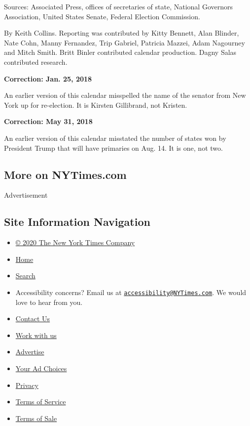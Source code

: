 Sources: Associated Press, offices of secretaries of state, National
Governors Association, United States Senate, Federal Election
Commission.

By Keith Collins. Reporting was contributed by Kitty Bennett, Alan
Blinder, Nate Cohn, Manny Fernandez, Trip Gabriel, Patricia Mazzei, Adam
Nagourney and Mitch Smith. Britt Binler contributed calendar production.
Dagny Salas contributed research.

\textbf{Correction: Jan. 25, 2018}

An earlier version of this calendar misspelled the name of the senator
from New York up for re-election. It is Kirsten Gillibrand, not Kristen.

\textbf{Correction: May 31, 2018}

An earlier version of this calendar misstated the number of states won
by President Trump that will have primaries on Aug. 14. It is one, not
two.

\hypertarget{more-on-nytimescom}{%
\subsection{More on NYTimes.com}\label{more-on-nytimescom}}

Advertisement

\hypertarget{site-information-navigation}{%
\subsection{Site Information
Navigation}\label{site-information-navigation}}

\begin{itemize}
\tightlist
\item
  \href{https://help.nytimes3xbfgragh.onion/hc/en-us/articles/115014792127-Copyright-notice}{©
  2020 The New York Times Company}
\item
  \href{https://www.nytimes3xbfgragh.onion}{Home}
\item
  \href{https://www.nytimes3xbfgragh.onion/search/}{Search}
\item
  Accessibility concerns? Email us at
  \href{mailto:accessibility@NYTimes.com}{\nolinkurl{accessibility@NYTimes.com}}.
  We would love to hear from you.
\item
  \href{https://help.nytimes3xbfgragh.onion/hc/en-us/articles/115015385887-Contact-Us}{Contact
  Us}
\item
  \href{https://www.nytco.com/careers/}{Work with us}
\item
  \href{https://nytmediakit.com/}{Advertise}
\item
  \href{https://help.nytimes3xbfgragh.onion/hc/en-us/articles/115014892108-Privacy-policy\#pp}{Your
  Ad Choices}
\item
  \href{https://help.nytimes3xbfgragh.onion/hc/en-us/articles/115014892108-Privacy-policy}{Privacy}
\item
  \href{https://help.nytimes3xbfgragh.onion/hc/en-us/articles/115014893428-Terms-of-service}{Terms
  of Service}
\item
  \href{https://help.nytimes3xbfgragh.onion/hc/en-us/articles/115014893968-Terms-of-sale}{Terms
  of Sale}
\end{itemize}

